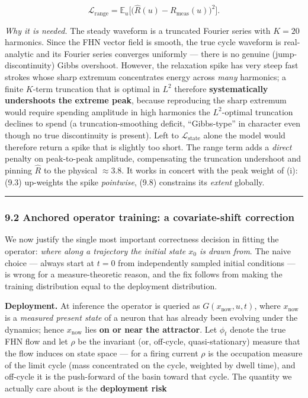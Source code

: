 \documentclass[
  11pt,
]{article}
\begin{document}
\[
\mathcal{L}_{\text{range}}
=\mathbb{E}_{u}\Big[\big(\hat{R}(u)-R_{\text{meas}}(u)\big)^{2}\Big].
\tag{9.8}
\]

\emph{Why it is needed.} The steady waveform is a truncated Fourier
series with \(K=20\) harmonics. Since the FHN vector field is smooth,
the true cycle waveform is real-analytic and its Fourier series
converges uniformly --- there is no genuine (jump-discontinuity) Gibbs
overshoot. However, the relaxation spike has very steep fast strokes
whose sharp extremum concentrates energy across \emph{many} harmonics; a
finite \(K\)-term truncation that is optimal in \(L^2\) therefore
\textbf{systematically undershoots the extreme peak}, because
reproducing the sharp extremum would require spending amplitude in high
harmonics the \(L^2\)-optimal truncation declines to spend (a
truncation-smoothing deficit, ``Gibbs-type'' in character even though no
true discontinuity is present). Left to \(\mathcal{L}_{\text{state}}\)
alone the model would therefore return a spike that is slightly too
short. The range term adds a \emph{direct} penalty on peak-to-peak
amplitude, compensating the truncation undershoot and pinning
\(\hat{R}\) to the physical \(\approx 3.8\). It works in concert with
the peak weight of (i): (9.3) up-weights the spike \emph{pointwise},
(9.8) constrains its \emph{extent} globally.

\begin{center}\rule{0.5\linewidth}{0.5pt}\end{center}

\subsubsection{9.2 Anchored operator training: a covariate-shift
correction}\label{anchored-operator-training-a-covariate-shift-correction}

We now justify the single most important correctness decision in fitting
the operator: \emph{where along a trajectory the initial state \(x_0\)
is drawn from}. The naive choice --- always start at \(t=0\) from
independently sampled initial conditions --- is wrong for a
measure-theoretic reason, and the fix follows from making the training
distribution equal to the deployment distribution.

\textbf{Deployment.} At inference the operator is queried as
\(G(x_{\text{now}},u,t)\), where \(x_{\text{now}}\) is a \emph{measured
present state} of a neuron that has already been evolving under the
dynamics; hence \(x_{\text{now}}\) lies \textbf{on or near the
attractor}. Let \(\phi_t\) denote the true FHN flow and let \(\rho\) be
the invariant (or, off-cycle, quasi-stationary) measure that the flow
induces on state space --- for a firing current \(\rho\) is the
occupation measure of the limit cycle (mass concentrated on the cycle,
weighted by dwell time), and off-cycle it is the push-forward of the
basin toward that cycle. The quantity we actually care about is the
\textbf{deployment risk}
\end{document}

